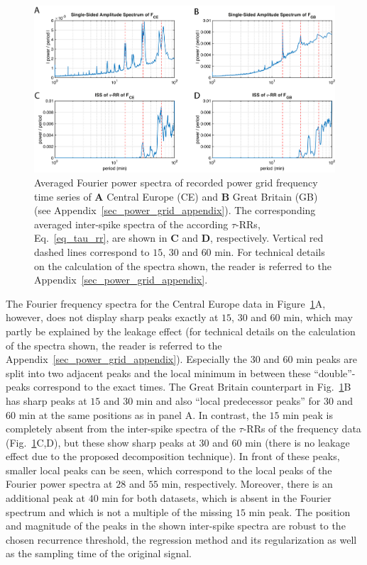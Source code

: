 \documentclass[entropy,article,submit,pdftex,moreauthors]{Definitions/mdpi}
\begin{document}
\begin{figure}
 \centering
 \includegraphics[width=\textwidth]{./figures/fig_power_grid_spectra}
 \caption{Averaged Fourier power spectra of recorded power grid frequency time series of \textbf{A} Central Europe (CE) and \textbf{B} Great Britain (GB) (see Appendix~\ref{sec_power_grid_appendix}). 
 The corresponding averaged inter-spike spectra of the according $\tau$-RRs, Eq.~\eqref{eq_tau_rr}, are shown in \textbf{C} and \textbf{D}, respectively. Vertical red dashed lines correspond to 
 $15$, $30$ and $60$ \si{min}. For technical details on the calculation of the spectra shown, the reader is referred to the Appendix~\ref{sec_power_grid_appendix}.}  
\label{fig_power_grid_spectra}
\end{figure}

The Fourier frequency spectra for the Central Europe data in Figure~\ref{fig_power_grid_spectra}A, however, does not display sharp peaks exactly at $15$, $30$ and $60$ \si{min}, which may partly 
be explained by the leakage effect (for technical details on the calculation of 
the spectra shown, the reader is referred to the Appendix~\ref{sec_power_grid_appendix}). Especially the $30$ and $60$ \si{min} 
peaks are split into two adjacent peaks and the local minimum in between these ``double''-peaks correspond to the exact times. The Great Britain counterpart in Fig.~\ref{fig_power_grid_spectra}B 
has sharp peaks at $15$ and $30$ \si{min} and also ``local predecessor peaks'' for $30$ and $60$ \si{min} at the same positions as in panel A. 
In contrast, the $15$ \si{min} peak is completely absent from the inter-spike spectra of the $\tau$-RRs of the frequency data (Fig.~\ref{fig_power_grid_spectra}C,D), but these show sharp peaks 
at $30$ and $60$ \si{min} (there is no leakage effect due to the proposed decomposition technique). 
In front of these peaks, smaller local peaks can be seen, which correspond to the local peaks of the Fourier power spectra at $28$ and $55$ \si{min}, respectively.
Moreover, there is an additional peak at 
$40$ \si{min} for both datasets, which is absent in the Fourier spectrum and which is not a multiple of the missing $15$ \si{min} peak. The position and magnitude of the peaks in the shown 
inter-spike spectra are robust to the chosen recurrence threshold, the regression method and its regularization as well as the sampling time of the original signal.
\end{document}
